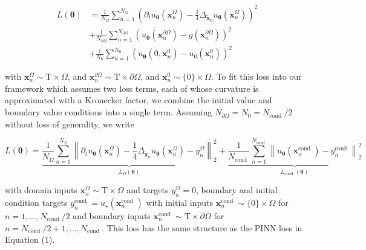 \documentclass[10pt]{article}
\begin{document}
$$
\begin{aligned}
L(\boldsymbol{\theta}) & =\frac{1}{N_{\Omega}} \sum_{n=1}^{N_{\Omega}}\left(\partial_{t} u_{\boldsymbol{\theta}}\left(\boldsymbol{x}_{n}^{\Omega}\right)-\frac{1}{4} \Delta_{\tilde{\boldsymbol{x}}_{n}} u_{\boldsymbol{\theta}}\left(\boldsymbol{x}_{n}^{\Omega}\right)\right)^{2} \\
& +\frac{1}{N_{\partial \Omega}} \sum_{n=1}^{N_{\partial \Omega}}\left(u_{\boldsymbol{\theta}}\left(\boldsymbol{x}_{n}^{\partial \Omega}\right)-g\left(\boldsymbol{x}_{n}^{\partial \Omega}\right)\right)^{2} \\
& +\frac{1}{N_{0}} \sum_{n=1}^{N_{0}}\left(u_{\boldsymbol{\theta}}\left(0, \boldsymbol{x}_{n}^{0}\right)-u_{0}\left(\boldsymbol{x}_{n}^{0}\right)\right)^{2}
\end{aligned}
$$

with $\boldsymbol{x}_{n}^{\Omega} \sim \mathrm{T} \times \Omega$, and $\boldsymbol{x}_{n}^{\partial \Omega} \sim \mathrm{T} \times \partial \Omega$, and $\boldsymbol{x}_{n}^{0} \sim\{0\} \times \Omega$. To fit this loss into our framework which assumes two loss terms, each of whose curvature is approximated with a Kronecker factor, we combine the initial value and boundary value conditions into a single term. Assuming $N_{\partial \Omega}=N_{0}=N_{\text {cond }} / 2$ without loss of generality, we write

$$
L(\boldsymbol{\theta})=\underbrace{\frac{1}{N_{\Omega}} \sum_{n=1}^{N_{\Omega}}\left\|\partial_{t} u_{\boldsymbol{\theta}}\left(\boldsymbol{x}_{n}^{\Omega}\right)-\frac{1}{4} \Delta_{\tilde{\boldsymbol{x}}_{n}} u_{\boldsymbol{\theta}}\left(\boldsymbol{x}_{n}^{\Omega}\right)-y_{n}^{\Omega}\right\|_{2}^{2}}_{L_{\Omega}(\boldsymbol{\theta})}+\underbrace{\frac{1}{N_{\text {cond }}} \sum_{n=1}^{N_{\text {cond }}}\left\|u_{\boldsymbol{\theta}}\left(\boldsymbol{x}_{n}^{\text {cond }}\right)-y_{n}^{\text {cond }}\right\|_{2}^{2}}_{L_{\text {cond }}(\boldsymbol{\theta})}
$$

with domain inputs $\boldsymbol{x}_{n}^{\Omega} \sim \mathrm{T} \times \Omega$ and targets $y_{n}^{\Omega}=0$, boundary and initial condition targets $y_{n}^{\text {cond }}=u_{\star}\left(\boldsymbol{x}_{n}^{\text {cond }}\right)$ with initial inputs $\boldsymbol{x}_{n}^{\text {cond }} \sim\{0\} \times \Omega$ for $n=1, \ldots, N_{\text {cond }} / 2$ and boundary inputs $\boldsymbol{x}_{n}^{\text {cond }} \sim \mathrm{T} \times \partial \Omega$ for $n=N_{\text {cond }} / 2+1, \ldots, N_{\text {cond }}$. This loss has the same structure as the PINN loss in Equation (1).
\end{document}
